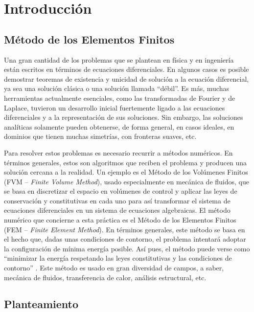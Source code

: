
\section{Introducción}

\subsection{Método de los Elementos Finitos}

Una gran cantidad de los problemas que se plantean en física y en ingeniería están escritos en términos de ecuaciones diferenciales. En algunos casos es posible demostrar teoremas de existencia y unicidad de solución a la ecuación diferencial, ya sea una solución clásica o una solución llamada ``débil''. Es más, muchas herramientas actualmente esenciales, como las transformadas de Fourier y de Laplace, tuvieron un desarrollo inicial fuertemente ligado a las ecuaciones diferenciales y a la representación de sus soluciones. Sin embargo, las soluciones analíticas solamente pueden obtenerse, de forma general, en casos ideales, \eg en dominios que tienen muchas simetrías, con fronteras suaves, etc. 

Para resolver estos problemas es necesario recurrir a métodos numéricos. En términos generales, estos son algoritmos que reciben el problema y producen una solución cercana a la realidad. Un ejemplo es el Método de los Volúmenes Finitos (FVM -- \emph{Finite Volume Method}), usado especialmente en mecánica de fluidos, que se basa en discretizar el espacio en volúmenes de control y aplicar las leyes de conservación y constitutivas en cada uno para así transformar el sistema de ecuaciones diferenciales en un sistema de ecuaciones algebraicas. El método numérico que concierne a esta práctica es el Método de los Elementos Finitos (FEM -- \emph{Finite Element Method}). En términos generales, este método se basa en el hecho que, dadas unas condiciones de contorno, el problema intentará adoptar la configuración de mínima energía posible. Así pues, el método puede verse como ``minimizar la energía respetando las leyes constitutivas y las condiciones de contorno'' \cite{femSimScale}. Este método es usado en gran diversidad de campos, a saber, mecánica de fluidos, transferencia de calor, análisis estructural, etc.


\subsection{Planteamiento} \label{sec:planteamiento}


